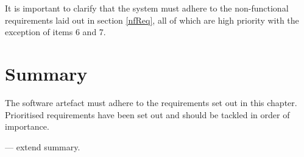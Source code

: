 It is important to clarify that the system must adhere to the non-functional requirements laid out in section \ref{nfReq}, all of which are high priority with the exception of items 6 and 7. \revisit

\section{Summary}
The software artefact must adhere to the requirements set out in this chapter.  Prioritised requirements have been set out and should be tackled in order of importance. 

\revisit --- extend summary.